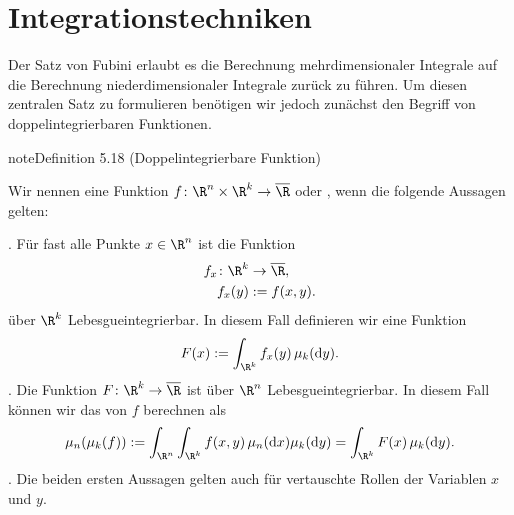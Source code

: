 \documentclass[letterpaper,10pt,english]{jupyterBook}
\begin{document}
\section{Integrationstechniken}
\label{\detokenize{masstheorie/integrationstechnik:integrationstechniken}}\label{\detokenize{masstheorie/integrationstechnik::doc}}
\sphinxAtStartPar
Der Satz von Fubini erlaubt es die Berechnung mehrdimensionaler Integrale auf die Berechnung niederdimensionaler Integrale zurück zu führen.
Um diesen zentralen Satz zu formulieren benötigen wir jedoch zunächst den Begriff von doppelintegrierbaren Funktionen.
\label{masstheorie/integrationstechnik:definition-0}
\begin{sphinxadmonition}{note}{Definition 5.18 (Doppelintegrierbare Funktion)}



\sphinxAtStartPar
Wir nennen eine Funktion \(f \colon \R^n \times \R^k \rightarrow \overline{\R}\)  oder ,
wenn die folgende Aussagen gelten:

. Für fast alle Punkte \(x \in \R^n\) ist die Funktion
\begin{equation*}
\begin{split}f_x \colon \R^k &\rightarrow \overline{\R},\\
f_x(y) &:= f(x,y).\end{split}
\end{equation*}
\sphinxAtStartPar
über \(\R^k\) Lebesgue\sphinxhyphen{}integrierbar.
In diesem Fall definieren wir eine Funktion
\begin{equation*}
\begin{split}F(x) := \int_{\R^k} f_x(y) \, \mu_k(\mathrm{d}y).\end{split}
\end{equation*}
. Die Funktion \(F \colon \R^k \rightarrow \overline{\R}\) ist über \(\R^n\) Lebesgue\sphinxhyphen{}integrierbar.
In diesem Fall können wir das  von \(f\) berechnen als
\begin{equation*}
\begin{split}\mu_n(\mu_k(f)) := \int_{\R^n}\int_{\R^k} f(x,y) \, \mu_n(\mathrm{d}x) \mu_k(\mathrm{d}y) = \int_{\R^k} F(x) \, \mu_k(\mathrm{d}y).\end{split}
\end{equation*}
. Die beiden ersten Aussagen gelten auch für vertauschte Rollen der Variablen \(x\) und \(y\).
\end{sphinxadmonition}
\end{document}
